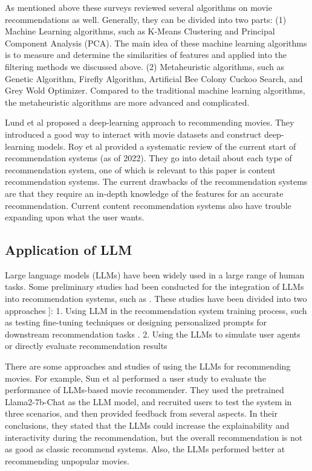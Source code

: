 \documentclass[journal]{IEEEtran}
\theoremstyle{mydefstyle}
\begin{document}
As mentioned above these surveys reviewed several algorithms on movie recommendations as well. Generally, they can be divided into two parts: (1) Machine Learning algorithms, such as K-Means Clustering and Principal Component Analysis (PCA). The main idea of these machine learning algorithms is to measure and determine the similarities of features and applied into the filtering methods we discussed above. (2) Metaheuristic algorithms, such as Genetic Algorithm, Firefly Algorithm, Artificial Bee Colony Cuckoo Search, and Grey Wold Optimizer. Compared to the traditional machine learning algorithms, the metaheuristic algorithms are more advanced and complicated.

Lund et al\cite{RN7} proposed a deep-learning approach to recommending movies. They introduced a good way to interact with movie datasets and construct deep-learning models.
Roy et al\cite{RN17} provided a systematic review of the current start of recommendation systems (as of 2022). They go into detail about each type of recommendation system, one of which is relevant to this paper is content recommendation systems. The current drawbacks of the recommendation systems are that they require an in-depth knowledge of the features for an accurate recommendation. Current content recommendation systems also have trouble expanding upon what the user wants.

\subsection{Application of LLM}
Large language models (LLMs) have been widely used in a large range of human tasks. Some preliminary studies had been conducted for the integration of LLMs into recommendation systems, such as . These studies have been divided into two approaches \cite{sun2024large}]: 1. Using LLM in the recommendation system training process, such as testing fine-tuning techniques or designing personalized prompts for downstream recommendation tasks \cite{Zhang2021}\cite{geng2023recommendation}. 2. Using the LLMs to simulate user agents or directly evaluate recommendation results \cite{huang2024recommender}\cite{xu2024prompting}

There are some approaches and studies of using the LLMs for recommending movies. For example, Sun et al \cite{sun2024large} performed a user study to evaluate the performance of LLMs-based movie recommender. They used the pretrained Llama2-7b-Chat as the LLM model, and recruited users to test the system in three scenarios, and then provided feedback from several aspects. In their conclusions, they stated that the LLMs could increase the explainability and interactivity during the recommendation, but the overall recommendation is not as good as classic recommend systems. Also, the LLMs performed better at recommending unpopular movies.
\end{document}

